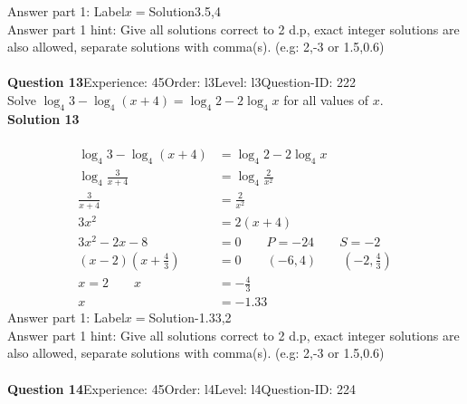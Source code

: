 \documentclass{article}
\begin{document}
Answer part 1: \hspace{10pt}Label\hspace{10pt}$x=$\hspace{10pt}Solution\hspace{10pt}3.5,4\\
Answer part 1 hint: \hspace{15pt} Give all solutions correct to 2 d.p, exact integer solutions are also allowed, separate solutions with comma(s). (e.g: 2,-3 or 1.5,0.6)\\
\\[4pt]
\noindent\textbf{Question 13}\hspace{20pt}Experience: 45\hspace{20pt}Order: l3\hspace{20pt}Level: l3\hspace{20pt}Question-ID: 222\\[2pt]
Solve $\log_{4}3-\log_{4}(x+4)=\log_{4}2-2\log_{4}x$ for all values of $x$.\\[4pt]
\noindent\textbf{Solution 13}\\[2pt]
\\[-35pt]\begin{align*}
\log_{4}3-\log_{4}(x+4)&=\log_{4}2-2\log_{4}x\\[2pt]
\log_{4}\displaystyle\frac{3}{x+4}&=\log_{4}\displaystyle\frac{2}{x^2}\\[2pt]
\displaystyle\frac{3}{x+4}&=\displaystyle\frac{2}{x^2}\\[2pt]
3x^2&=2(x+4)\\[2pt]
3x^2-2x-8&=0\qquad P=-24\qquad S=-2\\[2pt]
(x-2)\left(x+\displaystyle\frac{4}{3}\right)&=0\qquad (-6,4)\qquad \left(-2,\displaystyle\frac{4}{3}\right)\\[2pt]
x=2\qquad x&=-\displaystyle\frac{4}{3}\\[2pt]
x&=-1.33
\end{align*}
Answer part 1: \hspace{10pt}Label\hspace{10pt}$x=$\hspace{10pt}Solution\hspace{10pt}-1.33,2\\
Answer part 1 hint: \hspace{15pt} Give all solutions correct to 2 d.p, exact integer solutions are also allowed, separate solutions with comma(s). (e.g: 2,-3 or 1.5,0.6)\\
\\[4pt]
\noindent\textbf{Question 14}\hspace{20pt}Experience: 45\hspace{20pt}Order: l4\hspace{20pt}Level: l4\hspace{20pt}Question-ID: 224\\[2pt]
\end{document}
